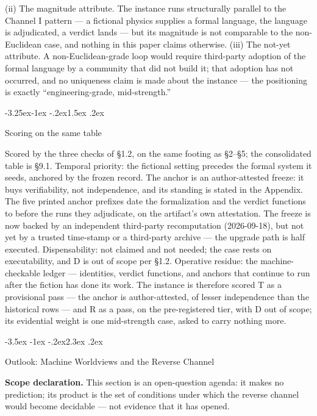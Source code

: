 \documentclass[11pt,a4paper]{article}
\makeatletter
\renewcommand\section{\@startsection{section}{1}{\z@}%
  {-3.5ex \@plus -1ex \@minus -.2ex}{2.3ex \@plus .2ex}%
  {\normalfont\Large\bfseries\raggedright}}
\renewcommand\subsection{\@startsection{subsection}{2}{\z@}%
  {-3.25ex\@plus -1ex \@minus -.2ex}{1.5ex \@plus .2ex}%
  {\normalfont\large\bfseries\raggedright}}
\makeatother
\begin{document}
(ii) The magnitude attribute. The instance runs structurally parallel to the Channel I pattern — a fictional physics supplies a formal language, the language is adjudicated, a verdict lands — but its magnitude is not comparable to the non-Euclidean case, and nothing in this paper claims otherwise. (iii) The not-yet attribute. A non-Euclidean-grade loop would require third-party adoption of the formal language by a community that did not build it; that adoption has not occurred, and no uniqueness claim is made about the instance — the positioning is exactly ``engineering-grade, mid-strength.''

\subsection{Scoring on the same table}

Scored by the three checks of §1.2, on the same footing as §2–§5; the consolidated table is §9.1. Temporal priority: the fictional setting precedes the formal system it seeds, anchored by the frozen record. The anchor is an author-attested freeze: it buys verifiability, not independence, and its standing is stated in the Appendix. The five printed anchor prefixes date the formalization and the verdict functions to before the runs they adjudicate, on the artifact's own attestation. The freeze is now backed by an independent third-party recomputation (2026-09-18), but not yet by a trusted time-stamp or a third-party archive — the upgrade path is half executed. Dispensability: not claimed and not needed; the case rests on executability, and D is out of scope per §1.2. Operative residue: the machine-checkable ledger — identities, verdict functions, and anchors that continue to run after the fiction has done its work. The instance is therefore scored T as a provisional pass — the anchor is author-attested, of lesser independence than the historical rows — and R as a pass, on the pre-registered tier, with D out of scope; its evidential weight is one mid-strength case, asked to carry nothing more.

\section{Outlook: Machine Worldviews and the Reverse Channel}

\textbf{Scope declaration.} This section is an open-question agenda: it makes no prediction; its product is the set of conditions under which the reverse channel would become decidable — not evidence that it has opened.
\end{document}

